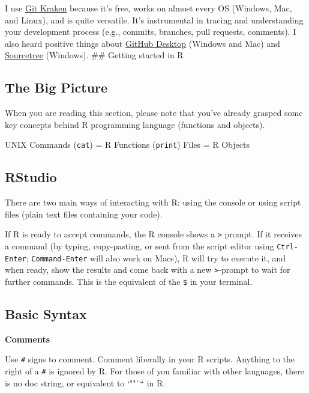 \documentclass[
]{book}
\begin{document}
I use \href{https://www.gitkraken.com/}{Git Kraken} because it's free, works on almost every OS (Windows, Mac, and Linux), and is quite versatile. It's instrumental in tracing and understanding your development process (e.g., commits, branches, pull requests, comments). I also heard positive things about \href{https://desktop.github.com/}{GitHub Desktop} (Windows and Mac) and \href{https://www.sourcetreeapp.com/}{Sourcetree} (Windows).
\#\# Getting started in R

\hypertarget{the-big-picture-2}{%
\subsection{The Big Picture}\label{the-big-picture-2}}

When you are reading this section, please note that you've already grasped some key concepts behind R programming language (functions and objects).

UNIX Commands (\texttt{cat}) = R Functions (\texttt{print})
Files = R Objects

\hypertarget{rstudio}{%
\subsection{RStudio}\label{rstudio}}

There are two main ways of interacting with R: using the console or using script files (plain text files containing your code).

If R is ready to accept commands, the R console shows a \texttt{\textgreater{}} prompt. If it receives a command (by typing, copy-pasting, or sent from the script editor using \texttt{Ctrl-Enter}; \texttt{Command-Enter} will also work on Macs), R will try to execute it, and when ready, show the results and come back with a new \texttt{\textgreater{}}-prompt to wait for further commands. This is the equivalent of the \texttt{\$} in your terminal.

\hypertarget{basic-syntax}{%
\subsection{Basic Syntax}\label{basic-syntax}}

\textbf{Comments}

Use \texttt{\#} signs to comment. Comment liberally in your R scripts. Anything to the right of a \texttt{\#} is ignored by R. For those of you familiar with other languages, there is no doc string, or equivalent to `""``` in R.
\end{document}
